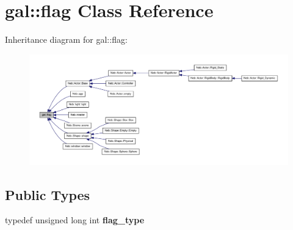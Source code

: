 \hypertarget{classgal_1_1flag}{\section{gal\-:\-:flag \-Class \-Reference}
\label{classgal_1_1flag}
}


\-Inheritance diagram for gal\-:\-:flag\-:
\nopagebreak
\begin{figure}[H]
\begin{center}
\leavevmode
\includegraphics[width=350pt]{classgal_1_1flag__inherit__graph}
\end{center}
\end{figure}
\subsection*{\-Public \-Types}
\begin{DoxyCompactItemize}
\item 
\hypertarget{classgal_1_1flag_a29c4c2b58d78fb8bc8e5f366d8f79c13}{typedef unsigned long int {\bfseries flag\-\_\-type}}\label{classgal_1_1flag_a29c4c2b58d78fb8bc8e5f366d8f79c13}

\end{DoxyCompactItemize}

